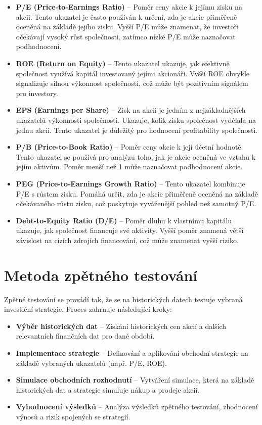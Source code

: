 \documentclass[12pt, a4paper]{report}
\begin{document}
\begin{itemize}
    \item \textbf{P/E (Price-to-Earnings Ratio)} – Poměr ceny akcie k jejímu zisku na akcii. Tento ukazatel je často používán k určení, zda je akcie přiměřeně oceněná na základě jejího zisku. Vyšší P/E může znamenat, že investoři očekávají vysoký růst společnosti, zatímco nízké P/E může naznačovat podhodnocení.
    
    \item \textbf{ROE (Return on Equity)} – Tento ukazatel ukazuje, jak efektivně společnost využívá kapitál investovaný jejími akcionáři. Vyšší ROE obvykle signalizuje silnou výkonnost společnosti, což může být pozitivním signálem pro investory.

    \item \textbf{EPS (Earnings per Share)} – Zisk na akcii je jedním z nejzákladnějších ukazatelů výkonnosti společnosti. Ukazuje, kolik zisku společnost vydělala na jednu akcii. Tento ukazatel je důležitý pro hodnocení profitability společnosti.

    \item \textbf{P/B (Price-to-Book Ratio)} – Poměr ceny akcie k její účetní hodnotě. Tento ukazatel se používá pro analýzu toho, jak je akcie oceněná ve vztahu k jejím aktivům. Poměr menší než 1 může naznačovat podhodnocení akcie.

    \item \textbf{PEG (Price-to-Earnings Growth Ratio)} – Tento ukazatel kombinuje P/E s růstem zisku. Pomáhá určit, zda je akcie přiměřeně oceněná na základě očekávaného růstu zisku, což poskytuje vyváženější pohled než samotný P/E.

    \item \textbf{Debt-to-Equity Ratio (D/E)} – Poměr dluhu k vlastnímu kapitálu ukazuje, jak společnost financuje své aktivity. Vyšší poměr znamená větší závislost na cizích zdrojích financování, což může znamenat vyšší riziko.
\end{itemize}

\section{Metoda zpětného testování}


Zpětné testování se provádí tak, že se na historických datech testuje vybraná investiční strategie. Proces zahrnuje následující kroky:
\begin{itemize}
    \item \textbf{Výběr historických dat} – Získání historických cen akcií a dalších relevantních finančních dat pro dané období.
    \item \textbf{Implementace strategie} – Definování a aplikování obchodní strategie na základě vybraných ukazatelů (např. P/E, ROE).
    \item \textbf{Simulace obchodních rozhodnutí} – Vytváření simulace, která na základě historických dat a strategie simuluje nákup a prodeje akcií.
    \item \textbf{Vyhodnocení výsledků} – Analýza výsledků zpětného testování, zhodnocení výnosů a rizik spojených se strategií.
\end{itemize}
\end{document}
